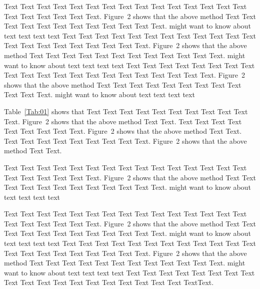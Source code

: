 \documentclass{bioinfo}
\begin{document}
Text Text Text Text Text Text  Text Text Text Text Text Text Text
Text Text  Text Text Text Text Text Text.
Figure~2\vphantom{\ref{nextstrain}} shows that the above method  Text
Text Text Text  Text Text Text Text Text Text  Text Text.
\citealp{neher2015nextflu} might want to know about  text text text text
Text Text Text Text Text Text  Text Text Text Text Text Text Text
Text Text  Text Text Text Text Text Text.
Figure~2\vphantom{\ref{nextstrain}} shows that the above method  Text
Text Text Text  Text Text Text Text Text Text  Text Text.
\citealp{neher2015nextflu} might want to know about  text text text text
Text Text Text Text Text Text Text Text Text Text Text Text Text
Text Text  Text Text Text Text Text Text.
Figure~2\vphantom{\ref{nextstrain}} shows that the above method  Text
Text Text Text  Text Text Text Text Text Text  Text Text.
\citealp{neher2015nextflu} might want to know about  text text text text

Table~\ref{Tab:01} shows that Text Text Text Text Text  Text Text
Text Text Text Text. Figure~2\vphantom{\ref{nextstrain}} shows that
the above method Text Text. Text Text Text  Text Text Text Text
Text Text. Figure~2\vphantom{\ref{nextstrain}} shows that the above
method Text Text. Text Text Text  Text Text Text Text Text Text.
Figure~2\vphantom{\ref{nextstrain}} shows that the above method Text
Text.

Text Text Text Text Text Text  Text Text Text Text Text Text Text
Text Text  Text Text Text Text Text Text.
Figure~2\vphantom{\ref{nextstrain}} shows that the above method  Text
Text Text Text  Text Text Text Text Text Text  Text Text.
\citealp{neher2015nextflu} might want to know about  text text text text

Text Text Text Text Text Text Text Text Text Text Text Text Text
Text Text Text Text Text Text Text Text.
Figure~2\vphantom{\ref{nextstrain}} shows that the
above method  Text Text Text Text Text Text Text Text Text Text
Text Text.  \citealp{neher2015nextflu} might want to know about text
text text text Text Text Text Text Text Text  Text Text Text Text
Text Text Text Text Text Text Text Text Text Text Text.
Figure~2\vphantom{\ref{nextstrain}} shows that the above method  Text
Text Text Text Text Text Text Text Text Text  Text Text.
\citealp{neher2015nextflu} might want to know about text text text text
Text Text Text Text Text Text  Text Text Text Text Text Text Text
Text Text Text Text Text Text Text\break Text.

\vspace*{-10pt}
\end{document}
